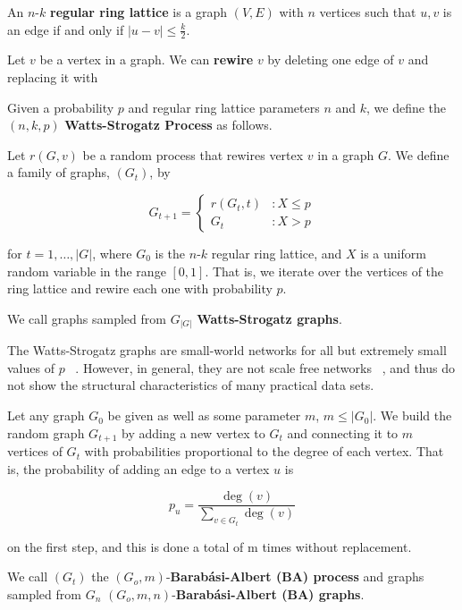 \begin{definition}
  An $n$-$k$ \textbf{regular ring lattice} is a graph $(V, E)$ with $n$ vertices
  such that $u,v$ is an edge if and only if $|u-v| \leq \frac{k}{2}$.
\end{definition}

\begin{definition}
  Let $v$ be a vertex in a graph. We can \textbf{rewire} $v$ by deleting one
  edge of $v$ and replacing it with 
\end{definition}

\begin{definition}
  Given a probability $p$ and regular ring lattice parameters $n$ and $k$, we
  define the $(n,k,p)$ \textbf{Watts-Strogatz Process} as follows.

  Let $r(G,v)$ be a random process that rewires vertex $v$ in a graph $G$. We
  define a family of graphs, $(G_t)$, by

  \[
    G_{t+1} = \left\{
      \begin{array}{lc}
        r(G_t,t) &: X \leq p \\
        G_t &: X > p
      \end{array}
    \right.
  \]

  for $t = 1,\dots, |G|$, where $G_0$ is the $n$-$k$ regular ring lattice, and
  $X$ is a uniform random variable in the range $[0,1]$. That is, we iterate
  over the vertices of the ring lattice and rewire each one with probability
  $p$.

  We call graphs sampled from $G_{|G|}$ \textbf{Watts-Strogatz graphs}.
\end{definition}

The Watts-Strogatz graphs are small-world networks for all but extremely small
values of $p$ ~\cite{Watts1998Collective}. However, in general, they are not
scale free networks ~\cite{Barabasi509}, and thus do not show the structural
characteristics of many practical data sets.

\begin{definition}
  Let any graph $G_0$ be given as well as some parameter $m$, $m \leq |G_0|$. We
  build the random graph $G_{t+1}$ by adding a new vertex to $G_t$ and
  connecting it to $m$ vertices of $G_t$ with probabilities proportional to the
  degree of each vertex. That is, the probability of adding an edge to a vertex
  $u$ is

  \[
    p_u = \frac{\deg(v)}{\sum_{v \in G_t} \deg(v)}
  \]

  on the first step, and this is done a total of m times without replacement.

  We call $(G_t)$ the $(G_o,m)$-\textbf{Barab\'asi-Albert (BA) process} and graphs
  sampled from $G_n$ $(G_o,m,n)$-\textbf{Barab\'asi-Albert (BA) graphs}.
\end{definition}

